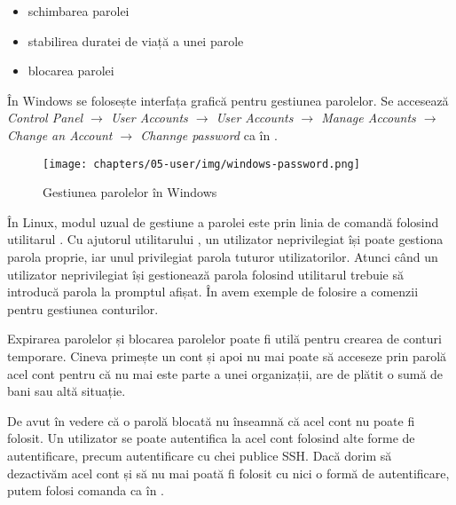 \begin{itemize}
  \item schimbarea parolei
  \item stabilirea duratei de viață a unei parole
  \item blocarea parolei
\end{itemize}

În Windows se folosește interfața grafică pentru gestiunea parolelor. Se
accesează \textit{Control Panel $\rightarrow$ User Accounts $\rightarrow$ User Accounts $\rightarrow$ Manage Accounts $\rightarrow$ Change an Account $\rightarrow$ Channge password} ca în .

\begin{figure}[!htbp]
  \centering
  \texttt{[image: chapters/05-user/img/windows-password.png]}
  \caption{Gestiunea parolelor în Windows}
  \label{fig:user:windows-password}
\end{figure}

În Linux, modul uzual de gestiune a parolei este prin linia de comandă folosind
utilitarul . Cu ajutorul utilitarului , un utilizator neprivilegiat
își poate gestiona parola proprie, iar unul privilegiat parola tuturor
utilizatorilor. Atunci când un utilizator neprivilegiat își gestionează parola
folosind utilitarul  trebuie să introducă parola la promptul afișat. În 
avem exemple de folosire a comenzii  pentru gestiunea conturilor.


Expirarea parolelor și blocarea parolelor poate fi utilă pentru crearea de
conturi temporare. Cineva primește un cont și apoi nu mai poate să acceseze prin
parolă acel cont pentru că nu mai este parte a unei organizații, are de plătit o
sumă de bani sau altă situație.

De avut în vedere că o parolă blocată nu înseamnă că acel cont nu poate fi
folosit. Un utilizator se poate autentifica la acel cont folosind alte forme de
autentificare, precum autentificare cu chei publice SSH. Dacă dorim să
dezactivăm acel cont și să nu mai poată fi folosit cu nici o formă de
autentificare, putem folosi comanda  ca în .

